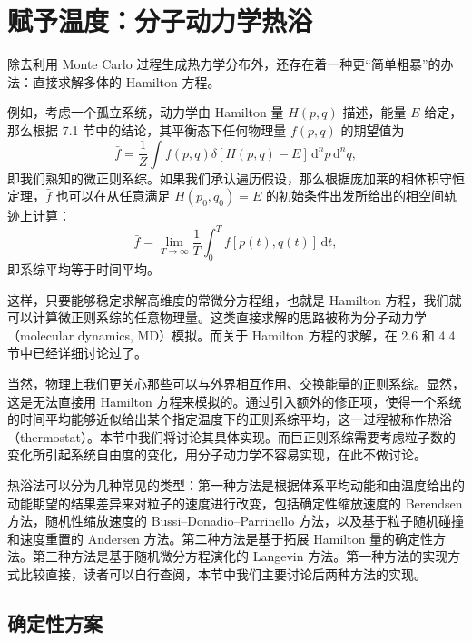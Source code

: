 \section{赋予温度：分子动力学热浴}

除去利用 Monte Carlo 过程生成热力学分布外，还存在着一种更“简单粗暴”的办法：直接求解多体的 Hamilton 方程。

例如，考虑一个孤立系统，动力学由 Hamilton 量 $H(p,q)$ 描述，能量 $E$ 给定，那么根据 7.1 节中的结论，其平衡态下任何物理量 $f(p,q)$ 的期望值为
\begin{equation}
\bar f=\frac1Z\int f(p,q)\delta[H(p,q)-E] \,\mathrm d^np\,\mathrm d^nq,
\tag{7.4.1}
\end{equation}
即我们熟知的微正则系综。如果我们承认遍历假设，那么根据庞加莱的相体积守恒定理，$\bar f$ 也可以在从任意满足 $H(p_0,q_0)=E$ 的初始条件出发所给出的相空间轨迹上计算：
\begin{equation}
\bar f=\lim_{T\to\infty}\frac1T\int_0^T f[p(t),q(t)]\,\mathrm dt,
\tag{7.4.2}
\end{equation}
即系综平均等于时间平均。

这样，只要能够稳定求解高维度的常微分方程组，也就是 Hamilton 方程，我们就可以计算微正则系综的任意物理量。这类直接求解的思路被称为分子动力学（molecular dynamics, MD）模拟。而关于 Hamilton 方程的求解，在 2.6 和 4.4 节中已经详细讨论过了。

当然，物理上我们更关心那些可以与外界相互作用、交换能量的正则系综。显然，这是无法直接用 Hamilton 方程来模拟的。通过引入额外的修正项，使得一个系统的时间平均能够近似给出某个指定温度下的正则系综平均，这一过程被称作热浴（thermostat）。本节中我们将讨论其具体实现。而巨正则系综需要考虑粒子数的变化所引起系统自由度的变化，用分子动力学不容易实现，在此不做讨论。

热浴法可以分为几种常见的类型：第一种方法是根据体系平均动能和由温度给出的动能期望的结果差异来对粒子的速度进行改变，包括确定性缩放速度的 Berendsen 方法，随机性缩放速度的 Bussi--Donadio--Parrinello 方法，以及基于粒子随机碰撞和速度重置的 Andersen 方法。第二种方法是基于拓展 Hamilton 量的确定性方法。第三种方法是基于随机微分方程演化的 Langevin 方法。第一种方法的实现方式比较直接，读者可以自行查阅，本节中我们主要讨论后两种方法的实现。

\subsection{确定性方案}

